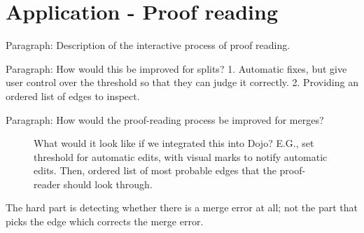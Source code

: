 \section{Application - Proof reading}

Paragraph: Description of the interactive process of proof reading.

Paragraph: How would this be improved for splits? 1. Automatic fixes, but give user control over the threshold so that they can judge it correctly. 2. Providing an ordered list of edges to inspect.

Paragraph: How would the proof-reading process be improved for merges?

\begin{figure}
\caption{What would it look like if we integrated this into Dojo? E.G., set threshold for automatic edits, with visual marks to notify automatic edits. Then, ordered list of most probable edges that the proof-reader should look through.}
\end{figure}

The hard part is detecting whether there is a merge error at all; not the part that picks the edge which corrects the merge error.